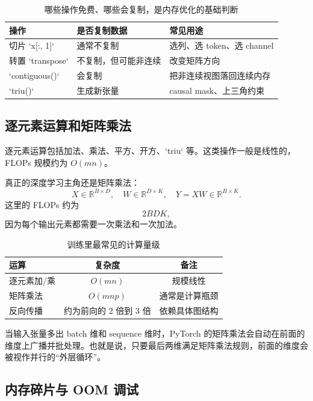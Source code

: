 \documentclass[a4paper]{article}
\begin{document}
\begin{table}[H]
\centering
\begin{tabular}{p{}p{}p{}}
\toprule
\textbf{操作} & \textbf{是否复制数据} & \textbf{常见用途} \\
\midrule
切片 `x[:, 1]` & 通常不复制 & 选列、选 token、选 channel \\
转置 `transpose` & 不复制，但可能非连续 & 改变矩阵方向 \\
`contiguous()` & 会复制 & 把非连续视图落回连续内存 \\
`triu()` & 生成新张量 & causal mask、上三角约束 \\
\bottomrule
\end{tabular}
\caption{哪些操作免费、哪些会复制，是内存优化的基础判断}
\end{table}

\subsection{逐元素运算和矩阵乘法}

逐元素运算包括加法、乘法、平方、开方、`triu` 等。这类操作一般是线性的，FLOPs 规模约为 \(O(mn)\)。

真正的深度学习主角还是矩阵乘法：
\[
X \in \mathbb{R}^{B\times D}, \quad W \in \mathbb{R}^{D\times K}, \quad Y = XW \in \mathbb{R}^{B\times K}.
\]
这里的 FLOPs 约为
\[
2BDK,
\]
因为每个输出元素都需要一次乘法和一次加法。

\begin{table}[H]
\centering
\begin{tabular}{lcc}
\toprule
\textbf{运算} & \textbf{复杂度} & \textbf{备注} \\
\midrule
逐元素加/乘 & \(O(mn)\) & 规模线性 \\
矩阵乘法 & \(O(mnp)\) & 通常是计算瓶颈 \\
反向传播 & 约为前向的 2 倍到 3 倍 & 依赖具体图结构 \\
\bottomrule
\end{tabular}
\caption{训练里最常见的计算量级}
\end{table}

当输入张量多出 batch 维和 sequence 维时，PyTorch 的矩阵乘法会自动在前面的维度上广播并批处理。也就是说，只要最后两维满足矩阵乘法规则，前面的维度会被视作并行的“外层循环”。

\subsection{内存碎片与 OOM 调试}
\end{document}
